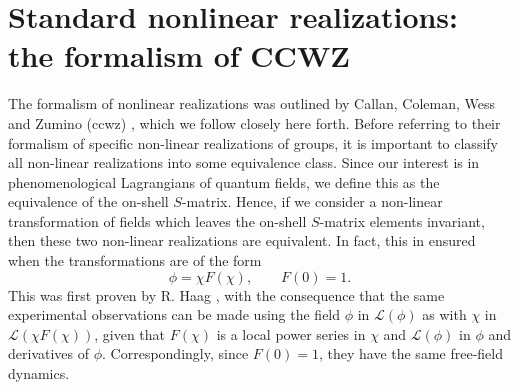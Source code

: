 \section{Standard nonlinear realizations: the formalism of CCWZ}
\label{sec:CCWZ}

The formalism of nonlinear realizations was outlined by Callan, Coleman, Wess and Zumino (\acrshort{ccwz}) \cite{RN642,RN643}, which we follow closely here forth. Before referring to their formalism of specific non-linear realizations of groups, it is important to classify all non-linear realizations into some equivalence class. Since our interest is in phenomenological Lagrangians of quantum fields, we define this as the equivalence of the on-shell $S$-matrix. Hence, if we consider a non-linear transformation of fields which leaves the on-shell $S$-matrix elements invariant, then these two non-linear realizations are equivalent. In fact, this in ensured when the transformations are of the form
\begin{equation}
\phi = \chi F(\chi),\qquad F(0)=1.
\end{equation}
This was first proven by R. Haag \cite{RN657}, with the consequence that the same experimental observations can be made using the field $\phi$ in $\mathcal{L}(\phi)$ as with $\chi$ in $\mathcal{L}(\chi F(\chi))$, given that $F(\chi)$ is a local power series in $\chi$ and $\mathcal{L}(\phi)$ in $\phi$ and derivatives of $\phi$. Correspondingly, since $F(0)=1$, they have the same free-field dynamics.


